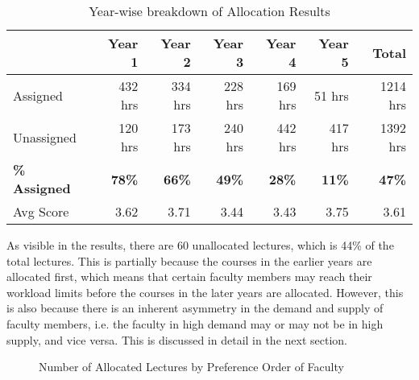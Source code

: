 \begin{table}[H]
  \centering
  \begin{tabular}{|l|r|r|r|r|r|r|}
    \hline
                         & \textbf{Year 1} & \textbf{Year 2} & \textbf{Year 3} & \textbf{Year 4} & \textbf{Year 5} & \textbf{Total} \\ \hline
    Assigned             & 432 hrs         & 334 hrs         & 228 hrs         & 169 hrs         & 51 hrs          & 1214 hrs       \\ \hline
    Unassigned           & 120 hrs         & 173 hrs         & 240 hrs         & 442 hrs         & 417 hrs         & 1392 hrs       \\ \hline
    \textbf{\% Assigned} & \textbf{78\%}   & \textbf{66\%}   & \textbf{49\%}   & \textbf{28\%}   & \textbf{11\%}   & \textbf{47\%}  \\ \hline
    Avg Score            & 3.62            & 3.71            & 3.44            & 3.43            & 3.75            & 3.61           \\ \hline
  \end{tabular}
  \caption{Year-wise breakdown of Allocation Results}
  \label{tab:lec_alloc_results}
\end{table}

As visible in the results, there are 60 unallocated lectures, which is 44\% of the total lectures. This is partially because the courses in the earlier years are allocated first, which means that certain faculty members may reach their workload limits before the courses in the later years are allocated. However, this is also because there is an inherent asymmetry in the demand and supply of faculty members, i.e. the faculty in high demand may or may not be in high supply, and vice versa. This is discussed in detail in the next section.

\begin{figure}[H]
  \centering
  \caption{Number of Allocated Lectures by Preference Order of Faculty}
  \label{fig:pref_order}
\end{figure}

